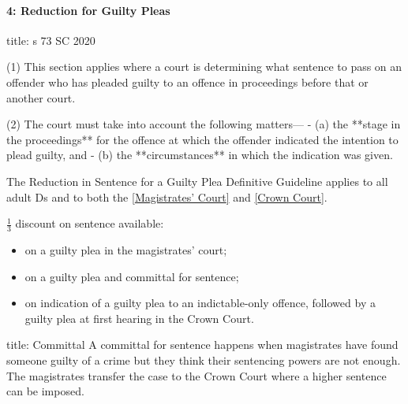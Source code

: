 \documentclass[
]{article}
\newenvironment{Shaded}{}{}
\newcommand{\NormalTok}[1]{#1}
\providecommand{\tightlist}{%
  \setlength{\itemsep}{0pt}\setlength{\parskip}{0pt}}
\begin{document}
\hypertarget{reduction-for-guilty-pleas}{%
\paragraph{4: Reduction for Guilty
Pleas}\label{reduction-for-guilty-pleas}}

\begin{Shaded}
\begin{Highlighting}[]
\NormalTok{title: s 73 SC 2020}

\NormalTok{(1) This section applies where a court is determining what sentence to pass on an offender who has pleaded guilty to an offence in proceedings before that or another court.}

\NormalTok{(2) The court must take into account the following matters—}
\NormalTok{{-} (a) the **stage in the proceedings** for the offence at which the offender indicated the intention to plead guilty, and}
\NormalTok{{-} (b) the **circumstances** in which the indication was given.}
\end{Highlighting}
\end{Shaded}

The Reduction in Sentence for a Guilty Plea Definitive Guideline applies
to all adult Ds and to both the
\href{maximum\%20compensation\%20of\%20£5,000\%20per\%20offence}{{[}Magistrates'
Court{]}} and \href{no\%20financial\%20limit.}{{[}Crown Court{]}}.

\(\frac{1}{3}\) discount on sentence available:

\begin{itemize}
\tightlist
\item
  on a guilty plea in the magistrates' court;
\item
  on a guilty plea and committal for sentence;
\item
  on indication of a guilty plea to an indictable-only offence, followed
  by a guilty plea at first hearing in the Crown Court.
\end{itemize}

\begin{Shaded}
\begin{Highlighting}[]
\NormalTok{title: Committal}
\NormalTok{A committal for sentence happens when magistrates have found someone guilty of a crime but they think their sentencing powers are not enough. The magistrates transfer the case to the Crown Court where a higher sentence can be imposed.}
\end{Highlighting}
\end{Shaded}
\end{document}
